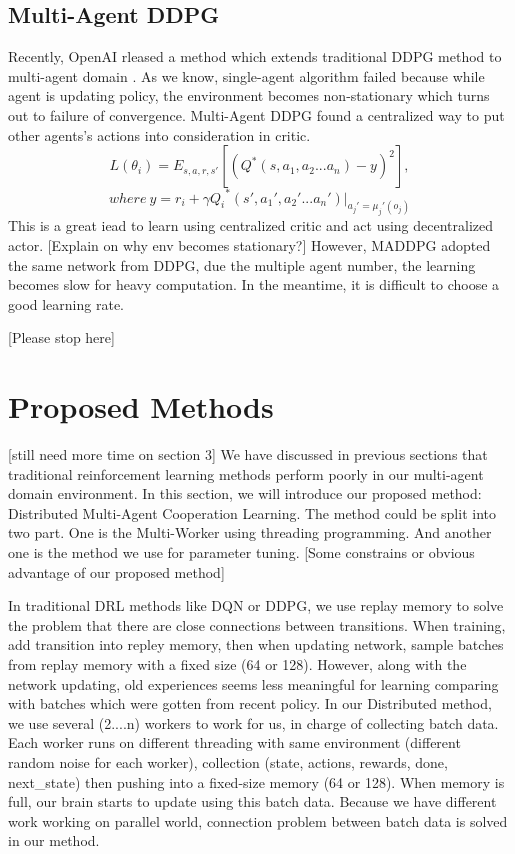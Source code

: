 \documentclass[11pt,twocolumn]{jarticle} %
\begin{document}
\subsection{Multi-Agent DDPG}
Recently, OpenAI rleased a method which extends traditional DDPG method to multi-agent domain \cite{4}. As we know, single-agent algorithm failed because while agent is updating policy, the environment becomes non-stationary which turns out to failure of convergence. Multi-Agent DDPG found a centralized way to put other agents's actions into consideration in critic.
\begin{equation}
L(\theta_i) = E_{s,a,r,s'}[(Q^*(s, a_1, a_2 ... a_n) - y)^2],  
\end{equation}
$$where\ y = r_i + \gamma{Q_i}^*(s', a_1', a_2' ... a_n') | _{a_j'=\mu_j'(o_j)}$$
This is a great iead to learn using centralized critic and act using decentralized actor. 
[Explain on why env becomes stationary?]
However, MADDPG adopted the same network from DDPG, due the multiple agent number, the learning becomes slow for heavy computation. In the meantime, it is difficult to choose a good learning rate.

[Please stop here]
\section{Proposed Methods}[still need more time on section 3]
We have discussed in previous sections that traditional reinforcement learning methods perform poorly in our multi-agent domain environment. In this section, we will introduce our proposed method: Distributed Multi-Agent Cooperation Learning. The method could be split into two part. One is the Multi-Worker using threading programming. And another one is the method we use for parameter tuning.
[Some constrains or obvious advantage of our proposed method]

In traditional DRL methods like DQN or DDPG, we use replay memory to solve the problem that there are close connections between transitions. When training, add transition into repley memory, then when updating network, sample batches from replay memory with a fixed size (64 or 128). However, along with the network updating, old experiences seems less meaningful for learning comparing with batches which were gotten from recent policy. 
In our Distributed method, we use several (2....n) workers to work for us, in charge of collecting batch data. Each worker runs on different threading with same environment (different random noise for each worker), collection (state, actions, rewards, done, next_state) then pushing into a fixed-size memory (64 or 128). When memory is full, our brain starts to update using this batch data. Because we have different work working on parallel world, connection problem between batch data is solved in our method.  
\end{document}
